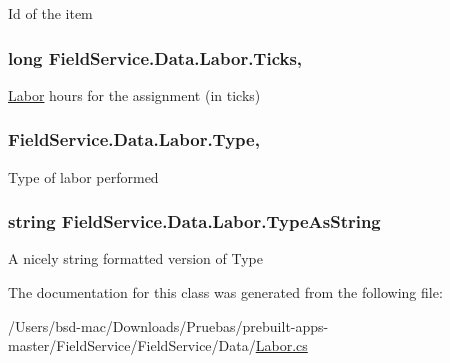 Id of the item 

\hypertarget{class_field_service_1_1_data_1_1_labor_a47ddd79856595414a77eca93b1f00716}{
\subsubsection[{Ticks}]{\setlength{\rightskip}{0pt plus 5cm}long Field\+Service.\+Data.\+Labor.\+Ticks\hspace{0.3cm}{\ttfamily [get]}, {\ttfamily [set]}}}\label{class_field_service_1_1_data_1_1_labor_a47ddd79856595414a77eca93b1f00716}


\hyperlink{class_field_service_1_1_data_1_1_labor}{Labor} hours for the assignment (in ticks) 

\hypertarget{class_field_service_1_1_data_1_1_labor_a0a5112fedad80abd43a9f9179ae70639}{
\subsubsection[{Type}]{ Field\+Service.\+Data.\+Labor.\+Type\hspace{0.3cm}{\ttfamily [get]}, {\ttfamily [set]}}}\label{class_field_service_1_1_data_1_1_labor_a0a5112fedad80abd43a9f9179ae70639}


Type of labor performed 

\hypertarget{class_field_service_1_1_data_1_1_labor_a184db30b7e0d531260e740d6b705f327}{
\subsubsection[{Type\+As\+String}]{\setlength{\rightskip}{0pt plus 5cm}string Field\+Service.\+Data.\+Labor.\+Type\+As\+String\hspace{0.3cm}{\ttfamily [get]}}}\label{class_field_service_1_1_data_1_1_labor_a184db30b7e0d531260e740d6b705f327}


A nicely string formatted version of Type 



The documentation for this class was generated from the following file\+:\begin{DoxyCompactItemize}
\item 
/\+Users/bsd-\/mac/\+Downloads/\+Pruebas/prebuilt-\/apps-\/master/\+Field\+Service/\+Field\+Service/\+Data/\hyperlink{_labor_8cs}{Labor.\+cs}\end{DoxyCompactItemize}

